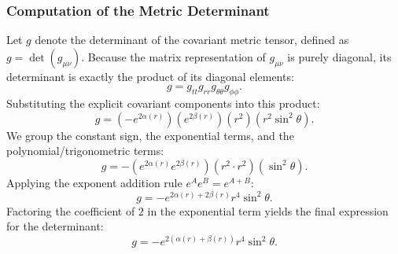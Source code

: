 \documentclass[11pt, a4paper]{report}
\begin{document}
\subsubsection{Computation of the Metric Determinant}
Let $g$ denote the determinant of the covariant metric tensor, defined as $g = \det(g_{\mu\nu})$. Because the matrix representation of $g_{\mu\nu}$ is purely diagonal, its determinant is exactly the product of its diagonal elements:
\begin{equation}
g = g_{tt} g_{rr} g_{\theta\theta} g_{\phi\phi}.
\end{equation}
Substituting the explicit covariant components into this product:
\begin{equation}
g = \left( -e^{2\alpha(r)} \right) \left( e^{2\beta(r)} \right) \left( r^2 \right) \left( r^2 \sin^2\theta \right).
\end{equation}
We group the constant sign, the exponential terms, and the polynomial/trigonometric terms:
\begin{equation}
g = - \left( e^{2\alpha(r)} e^{2\beta(r)} \right) \left( r^2 \cdot r^2 \right) \left( \sin^2\theta \right).
\end{equation}
Applying the exponent addition rule $e^A e^B = e^{A+B}$:
\begin{equation}
g = - e^{2\alpha(r) + 2\beta(r)} r^4 \sin^2\theta.
\end{equation}
Factoring the coefficient of $2$ in the exponential term yields the final expression for the determinant:
\begin{equation}
g = - e^{2(\alpha(r) + \beta(r))} r^4 \sin^2\theta.
\end{equation}
\end{document}
